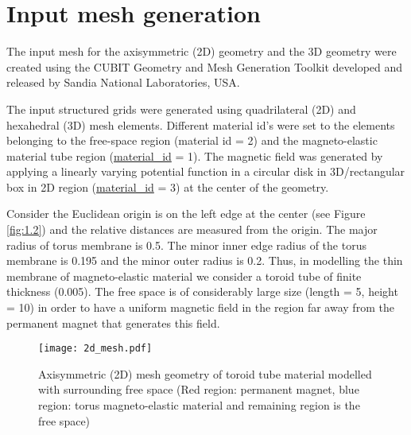 \section{Input mesh generation}
The input mesh for the axisymmetric (2D) geometry and the 3D geometry were created using the CUBIT Geometry and Mesh Generation Toolkit \cite{cubit} developed and released by Sandia National Laboratories, USA. \par 

The input structured grids were generated using quadrilateral (2D) and hexahedral (3D) mesh elements. Different material id's were set to the elements belonging to the free-space region (material id = 2) and the magneto-elastic material tube region (\href{https://www.dealii.org/current/doxygen/deal.II/structCellData.html#a7d4a093cec27f2f8c947dd97d3aab290}{material\_id} = 1). The magnetic field was generated by applying a linearly varying potential function in a circular disk in 3D/rectangular box in 2D region (\href{https://www.dealii.org/current/doxygen/deal.II/structCellData.html#a7d4a093cec27f2f8c947dd97d3aab290}{material\_id} = 3) at the center of the geometry. \par 

Consider the Euclidean origin is on the left edge at the center (see Figure \eqref{fig:1.2}) and the relative distances are measured from the origin. The major radius of torus membrane is 0.5. The minor inner edge radius of the torus membrane is 0.195 and the minor outer radius is 0.2. Thus, in modelling the thin membrane of magneto-elastic material we consider a toroid tube of finite thickness (0.005). The free space is of considerably large size (length = 5, height = 10) in order to have a uniform magnetic field in the region far away from the permanent magnet that generates this field. \par 

\begin{figure}[h]
\centering
\texttt{[image: 2d\_mesh.pdf]}
\caption{Axisymmetric (2D) mesh geometry of toroid tube material modelled with surrounding free space (Red region: permanent magnet, blue region: torus magneto-elastic material and remaining region is the free space)}
\label{fig:1.2}
\end{figure}

